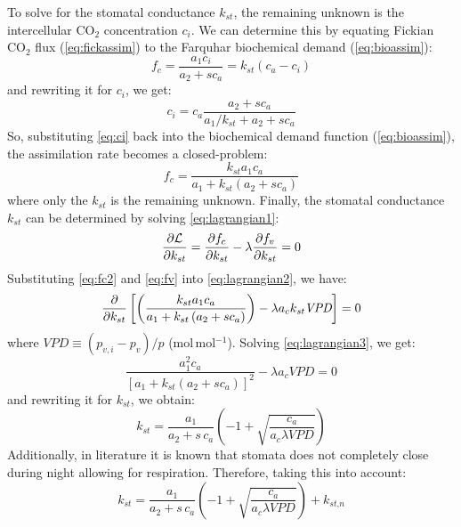 To solve for the stomatal conductance $k_{st}$, the remaining unknown is the intercellular CO$_2$ concentration $c_i$. We can determine this by equating Fickian CO$_2$ flux (\cref{eq:fickassim}) to the Farquhar biochemical demand (\cref{eq:bioassim}):
\begin{equation}
f_c = \frac{a_1 c_i}{a_2 + s c_a} = k_{st} \left(c_a - c_i\right)
\end{equation}
and rewriting it for $c_i$, we get:
\begin{equation}
c_i = c_a \frac{a_2 + s c_a}{a_1/k_{st} + a_2 + s c_a}
\label{eq:ci}
\end{equation}
So, substituting \cref{eq:ci} back into the biochemical demand function (\cref{eq:bioassim}), the assimilation rate becomes a closed-problem:
\begin{equation}
f_c = \frac{k_{st} a_1 c_a}{a_1 + k_{st} \left(a_2 + s c_a\right)}
\label{eq:fc2}
\end{equation}
where only the $k_{st}$ is the remaining unknown. Finally, the stomatal conductance $k_{\textit{st}}$ can be determined by solving \cref{eq:lagrangian1}:
\begin{equation}
\frac{\partial \mathcal{L}}{\partial k_{st}} = \frac{\partial f_c}{\partial k_{st}} - \lambda \frac{\partial f_v}{\partial k_{st}} = 0
\label{eq:lagrangian2}
\end{equation}
Substituting \cref{eq:fc2} and \cref{eq:fv} into \cref{eq:lagrangian2}, we have:
\begin{equation}
\frac{\partial }{\partial k_{st}} \left[ \left(\frac{k_{st} a_1 c_a}{a_1 + k_{st} \left(a_2 + s c_a\right)}\right)- \lambda a_c k_{\textit{st}} \textit{VPD} \right] = 0
\label{eq:lagrangian3}
\end{equation}
where $\textit{VPD} \equiv \left(p_{v,i} - p_v \right)/p$ (mol\,mol$^{-1}$). Solving \cref{eq:lagrangian3}, we get:
\begin{equation}
\frac{a_1^2 c_a}{\left[a_1 + k_{st} \left(a_2 + s c_a\right)\right]^2}- \lambda a_c \textit{VPD} = 0
\end{equation}
and rewriting it for $k_{\textit{st}}$, we obtain:
\begin{equation}
k_{\textit{st}} = \frac{a_1}{a_2 + s\,c_a} \left( -1 + \sqrt{\frac{c_a}{a_c \lambda \textit{VPD}}} \right)
\label{eq:kst}
\end{equation}
Additionally, in literature it is known that stomata does not completely close during night allowing for respiration. Therefore, taking this into account:
\begin{equation}
k_{\textit{st}} = \frac{a_1}{a_2 + s\,c_a} \left( -1 + \sqrt{\frac{c_a}{a_c \lambda \textit{VPD}}} \right) + k_{\textit{st,n}}
\end{equation}
